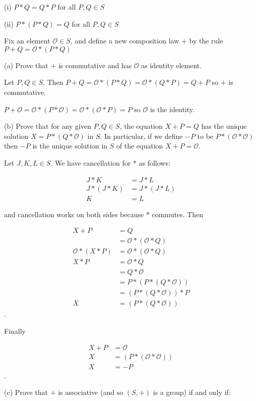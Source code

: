 \documentclass{article}
\begin{document}
(i) $P*Q = Q*P$ for all $P,Q \in S$

(ii) $P*(P*Q) = Q$ for all $P,Q \in S$

Fix an element $\mathcal{O} \in S$, and define a new composition law $+$ by the rule $P+Q = \mathcal{O} * (P * Q)$

(a) Prove that $+$ is commutative and has $\mathcal{O}$ as identity element.

Let $P,Q \in S$. Then $P+Q = \mathcal{O} * (P * Q) = \mathcal{O} * (Q * P) = Q+P$ so $+$ is commutative.

$P + \mathcal{O} = \mathcal{O} * (P * \mathcal{O}) = \mathcal{O} * (\mathcal{O} * P) = P$ so $\mathcal{O}$ is the identity.

(b) Prove that for any given $P,Q \in S$, the equation $X+P = Q$ has the unique solution $X = P*(Q*\mathcal{O})$ in $S$. In particular, if we define $-P$ to be $P*(\mathcal{O} * \mathcal{O})$ then $-P$ is the unique solution in $S$ of the equation $X+P = \mathcal{O}$.

Let $J, K, L \in S$. We have cancellation for $*$ as follows:

\begin{align*}
J * K &= J * L\\
J * (J * K) &= J * (J * L)\\
K &= L
\end{align*}

and cancellation works on both sides because $*$ commutes. Then

\begin{align*}
X+P & = Q \\
& = \mathcal{O} * (\mathcal{O} * Q) \\
\mathcal{O} * (X * P) &= \mathcal{O} * (\mathcal{O} * Q) \\
X * P &= \mathcal{O} * Q \\
&= Q * \mathcal{O} \\
&= P * (P * (Q * \mathcal{O})) \\
&= (P * (Q * \mathcal{O})) * P \\
X &= (P * (Q * \mathcal{O}))
\end{align*}.

Finally

\begin{align*}
X+P &= \mathcal{O}\\
X &= (P * (\mathcal{O} * \mathcal{O}))\\
X &= -P
\end{align*}.

(c) Prove that $+$ is associative (and so $(S,+)$ is a group) if and only if:
\end{document}
